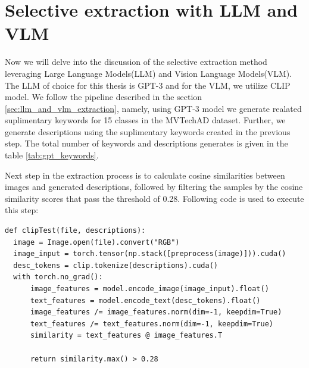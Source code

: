 \section{Selective extraction with LLM and VLM}
Now we will delve into the discussion of the selective extraction method leveraging Large Language Models(LLM) and Vision Language Models(VLM). The LLM of choice for this thesis is GPT-3 and for the VLM, we utilize CLIP model. We follow the pipeline described in the section \ref{sec:llm_and_vlm_extraction}, namely, using GPT-3 model we generate realated suplimentary keywords for 15 classes in the MVTechAD dataset. Further, we generate descriptions using the suplimentary keywords created in the previous step. The total number of keywords and descriptions generates is given in the table \ref{tab:gpt_keywords}.

Next step in the extraction process is to calculate cosine similarities between images and generated descriptions, followed by filtering the samples by the cosine similarity scores that pass the threshold of 0.28. Following code is used to execute this step:

\begin{lstlisting}
def clipTest(file, descriptions):
  image = Image.open(file).convert("RGB")
  image_input = torch.tensor(np.stack([preprocess(image)])).cuda()
  desc_tokens = clip.tokenize(descriptions).cuda()
  with torch.no_grad():
      image_features = model.encode_image(image_input).float()
      text_features = model.encode_text(desc_tokens).float()
      image_features /= image_features.norm(dim=-1, keepdim=True)
      text_features /= text_features.norm(dim=-1, keepdim=True)
      similarity = text_features @ image_features.T

      return similarity.max() > 0.28
\end{lstlisting}

